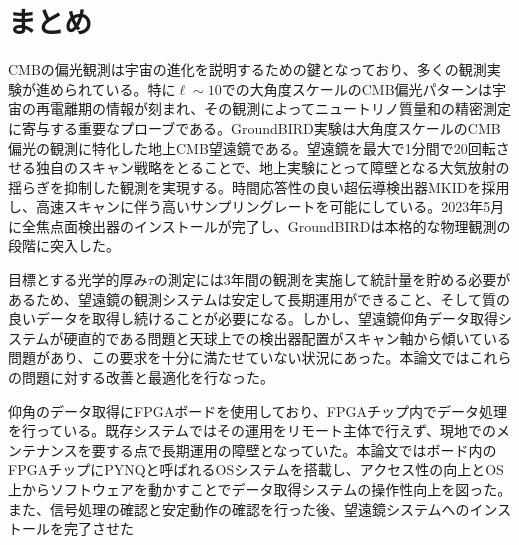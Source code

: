 \chapter{まとめ}
\label{chapter6}

CMBの偏光観測は宇宙の進化を説明するための鍵となっており、多くの観測実験が進められている。特に$\ell\sim 10$での大角度スケールのCMB偏光パターンは宇宙の再電離期の情報が刻まれ、その観測によってニュートリノ質量和の精密測定に寄与する重要なプローブである。GroundBIRD実験は大角度スケールのCMB偏光の観測に特化した地上CMB望遠鏡である。望遠鏡を最大で1分間で20回転させる独自のスキャン戦略をとることで、地上実験にとって障壁となる大気放射の揺らぎを抑制した観測を実現する。時間応答性の良い超伝導検出器MKIDを採用し、高速スキャンに伴う高いサンプリングレートを可能にしている。2023年5月に全焦点面検出器のインストールが完了し、GroundBIRDは本格的な物理観測の段階に突入した。

目標とする光学的厚み$\tau$の測定には3年間の観測を実施して統計量を貯める必要があるため、望遠鏡の観測システムは安定して長期運用ができること、そして質の良いデータを取得し続けることが必要になる。しかし、望遠鏡仰角データ取得システムが硬直的である問題と天球上での検出器配置がスキャン軸から傾いている問題があり、この要求を十分に満たせていない状況にあった。本論文ではこれらの問題に対する改善と最適化を行なった。

仰角のデータ取得にFPGAボードを使用しており、FPGAチップ内でデータ処理を行っている。既存システムではその運用をリモート主体で行えず、現地でのメンテナンスを要する点で長期運用の障壁となっていた。本論文ではボード内のFPGAチップにPYNQと呼ばれるOSシステムを搭載し、アクセス性の向上とOS上からソフトウェアを動かすことでデータ取得システムの操作性向上を図った。また、信号処理の確認と安定動作の確認を行った後、望遠鏡システムへのインストールを完了させた

